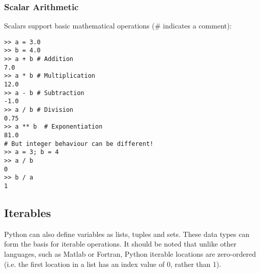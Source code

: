 \subsubsection{Scalar Arithmetic}

Scalars support basic mathematical operations (\# indicates a comment):

\begin{lstlisting}[frame=single]
>> a = 3.0
>> b = 4.0
>> a + b # Addition
7.0
>> a * b # Multiplication
12.0
>> a - b # Subtraction
-1.0
>> a / b # Division
0.75
>> a ** b  # Exponentiation
81.0
# But integer behaviour can be different!
>> a = 3; b = 4
>> a / b
0
>> b / a
1
\end{lstlisting}

\subsection{Iterables}

Python can also define variables as lists, tuples and sets. These data types can form the basis for iterable operations. It should be noted that unlike other languages, such as Matlab or Fortran, Python iterable locations are zero-ordered (i.e. the first location in a list has an index value of 0, rather than 1). 

